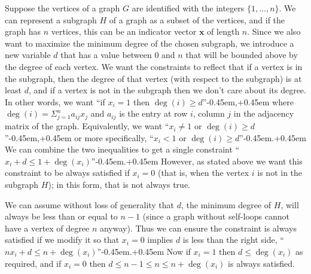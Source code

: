 Suppose the vertices of a graph $G$ are identified with the integers $\{1, \dotsc, n\}$.
We can represent a subgraph $H$ of a graph as a subset of the vertices, and if the graph has $n$ vertices, this can be an indicator vector $\mathbf{x}$ of length $n$.
Since we also want to maximize the minimum degree of the chosen subgraph, we introduce a new variable $d$ that has a value between $0$ and $n$ that will be bounded above by the degree of each vertex.
We want the constraints to reflect that if a vertex is in the subgraph, then the degree of that vertex (with respect to the subgraph) is at least $d$, and if a vertex is not in the subgraph then we don't care about its degree.
In other words, we want ``if $x_i = 1$ then $\deg(i) \geq d$''\kern-0.45em,\kern+0.45em where $\deg(i) = \Sigma_{j = 1}^n a_{ij} x_j$ and $a_{ij}$ is the entry at row $i$, column $j$ in the adjacency matrix of the graph.
Equivalently, we want ``$x_i \neq 1$ or $\deg(i) \geq d$''\kern-0.45em,\kern+0.45em or more specifically, ``$x_i < 1$ or $\deg(i) \geq d$''\kern-0.45em.\kern+0.45em
We can combine the two inequalities to get a single constraint ``$x_i + d \leq 1 + \deg(x_i)$''\kern-0.45em.\kern+0.45em
However, as stated above we want this constraint to be always satisfied if $x_i = 0$ (that is, when the vertex $i$ is not in the subgraph $H$); in this form, that is not always true.

We can assume without loss of generality that $d$, the minimum degree of $H$, will always be less than or equal to $n - 1$ (since a graph without self-loops cannot have a vertex of degree $n$ anyway).
Thus we can ensure the constraint is always satisfied if we modify it so that $x_i = 0$ implies $d$ is less than the right side, ``$n x_i + d \leq n + \deg(x_i)$''\kern-0.45em.\kern+0.45em
Now if $x_i = 1$ then $d \leq \deg(x_i)$ as required, and if $x_i = 0$ then $d \leq n- 1 \leq n \leq n + \deg(x_i)$ is always satisfied.

